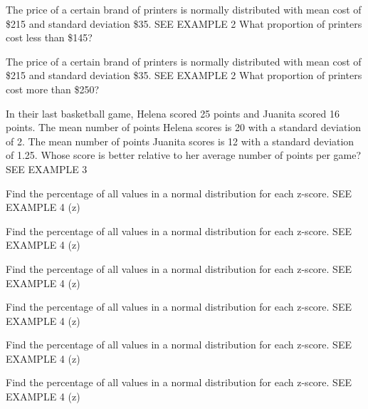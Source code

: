 \documentclass{article}
\newenvironment{practice}[2]{}{}        %
\newcommand{\answer}[1]{}               %
\newcommand{\te}[1]{}                   %
\begin{document}
\begin{practice}{16}{1}
The price of a certain brand of printers is normally distributed with mean cost of \$215 and standard deviation \$35. SEE EXAMPLE 2
What proportion of printers cost less than \$145?
\answer{2.5\%}
\end{practice}
\begin{practice}{17}{1}
The price of a certain brand of printers is normally distributed with mean cost of \$215 and standard deviation \$35. SEE EXAMPLE 2
What proportion of printers cost more than \$250?
\answer{16\%}
\end{practice}
\begin{practice}{18}{1}
In their last basketball game, Helena scored 25 points and Juanita scored 16 points. The mean number of points Helena scores is 20 with a standard deviation of 2. The mean number of points Juanita scores is 12 with a standard deviation of 1.25. Whose score is better relative to her average number of points per game? SEE EXAMPLE 3
\answer{Holly scoring 25 points represents (z=2.5), and Juanita scoring 16 points represents (z=3.2); Juanita scored better relative to her average.}
\te{Printed Holly in the key; the prompt names Helena.}
\end{practice}
\begin{practice}{19}{1}
Find the percentage of all values in a normal distribution for each z-score. SEE EXAMPLE 4
(z)
\answer{0.9842, or 98.42\%}
\end{practice}
\begin{practice}{20}{1}
Find the percentage of all values in a normal distribution for each z-score. SEE EXAMPLE 4
(z)
\answer{0.8944, or 89.44\%}
\end{practice}
\begin{practice}{21}{1}
Find the percentage of all values in a normal distribution for each z-score. SEE EXAMPLE 4
(z)
\answer{0.2676, or 26.76\%}
\end{practice}
\begin{practice}{22}{1}
Find the percentage of all values in a normal distribution for each z-score. SEE EXAMPLE 4
(z)
\answer{0.6844, or 68.44\%}
\end{practice}
\begin{practice}{23}{1}
Find the percentage of all values in a normal distribution for each z-score. SEE EXAMPLE 4
(z)
\answer{0.9177, or 91.77\%}
\end{practice}
\begin{practice}{24}{1}
Find the percentage of all values in a normal distribution for each z-score. SEE EXAMPLE 4
(z)
\answer{0.0119, or 1.19\%}
\end{practice}
\end{document}
